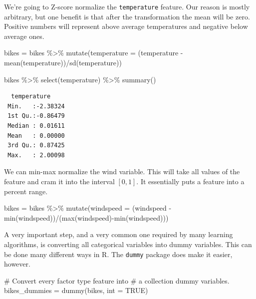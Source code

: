 \documentclass[
  letterpaper,
  DIV=11,
  numbers=noendperiod]{scrartcl}
\newenvironment{Shaded}{\begin{snugshade}}{\end{snugshade}}
\newcommand{\AttributeTok}[1]{\textcolor[rgb]{0.40,0.45,0.13}{#1}}
\newcommand{\CommentTok}[1]{\textcolor[rgb]{0.37,0.37,0.37}{#1}}
\newcommand{\ConstantTok}[1]{\textcolor[rgb]{0.56,0.35,0.01}{#1}}
\newcommand{\FunctionTok}[1]{\textcolor[rgb]{0.28,0.35,0.67}{#1}}
\newcommand{\NormalTok}[1]{\textcolor[rgb]{0.00,0.23,0.31}{#1}}
\newcommand{\OtherTok}[1]{\textcolor[rgb]{0.00,0.23,0.31}{#1}}
\newcommand{\SpecialCharTok}[1]{\textcolor[rgb]{0.37,0.37,0.37}{#1}}
\begin{document}
We're going to Z-score normalize the \texttt{temperature} feature. Our
reason is mostly arbitrary, but one benefit is that after the
transformation the mean will be zero. Positive numbers will represent
above average temperatures and negative below average ones.

\begin{Shaded}
\begin{Highlighting}[]
\NormalTok{bikes }\OtherTok{=}\NormalTok{ bikes }\SpecialCharTok{\%\textgreater{}\%}
  \FunctionTok{mutate}\NormalTok{(}\AttributeTok{temperature =}\NormalTok{ (temperature }\SpecialCharTok{{-}} \FunctionTok{mean}\NormalTok{(temperature))}\SpecialCharTok{/}\FunctionTok{sd}\NormalTok{(temperature))}

\NormalTok{bikes }\SpecialCharTok{\%\textgreater{}\%}
  \FunctionTok{select}\NormalTok{(temperature) }\SpecialCharTok{\%\textgreater{}\%}
  \FunctionTok{summary}\NormalTok{()}
\end{Highlighting}
\end{Shaded}

\begin{verbatim}
  temperature      
 Min.   :-2.38324  
 1st Qu.:-0.86479  
 Median : 0.01611  
 Mean   : 0.00000  
 3rd Qu.: 0.87425  
 Max.   : 2.00098  
\end{verbatim}

We can min-max normalize the wind variable. This will take all values of
the feature and cram it into the interval \([0, 1]\). It essentially
puts a feature into a percent range.

\begin{Shaded}
\begin{Highlighting}[]
\NormalTok{bikes }\OtherTok{=}\NormalTok{ bikes }\SpecialCharTok{\%\textgreater{}\%}
  \FunctionTok{mutate}\NormalTok{(}\AttributeTok{windspeed =}\NormalTok{ (windspeed }\SpecialCharTok{{-}} \FunctionTok{min}\NormalTok{(windspeed))}\SpecialCharTok{/}\NormalTok{(}\FunctionTok{max}\NormalTok{(windspeed)}\SpecialCharTok{{-}}\FunctionTok{min}\NormalTok{(windspeed)))}
\end{Highlighting}
\end{Shaded}

A very important step, and a very common one required by many learning
algorithms, is converting all categorical variables into dummy
variables. This can be done many different ways in R. The \texttt{dummy}
package does make it easier, however.

\begin{Shaded}
\begin{Highlighting}[]
\CommentTok{\# Convert every factor type feature into }
\CommentTok{\# a collection dummy variables.}
\NormalTok{bikes\_dummies }\OtherTok{=} \FunctionTok{dummy}\NormalTok{(bikes, }\AttributeTok{int =} \ConstantTok{TRUE}\NormalTok{)}
\end{Highlighting}
\end{Shaded}
\end{document}
